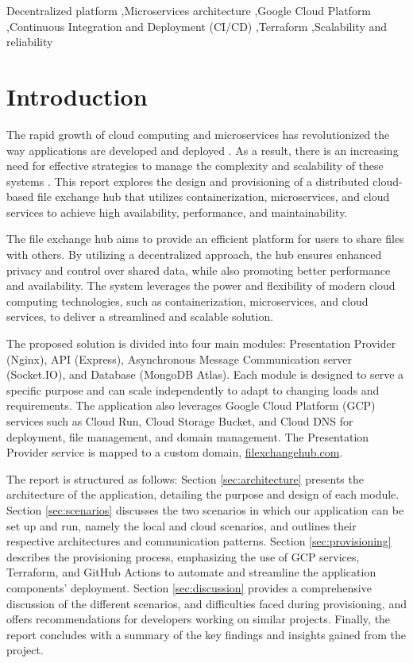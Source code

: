 \documentclass[a4paper,fleqn]{cas-sc}
\begin{document}
\begin{keywords}
Decentralized platform \sep Microservices architecture \sep Google Cloud Platform \sep Continuous Integration and Deployment (CI/CD) \sep Terraform \sep Scalability and reliability
\end{keywords}


\maketitle

\section{Introduction}

The rapid growth of cloud computing and microservices has revolutionized the way applications are developed and deployed \cite{}. As a result, there is an increasing need for effective strategies to manage the complexity and scalability of these systems \cite{}. This report explores the design and provisioning of a distributed cloud-based file exchange hub that utilizes containerization, microservices, and cloud services to achieve high availability, performance, and maintainability.

The file exchange hub aims to provide an efficient platform for users to share files with others. By utilizing a decentralized approach, the hub ensures enhanced privacy and control over shared data, while also promoting better performance and availability. The system leverages the power and flexibility of modern cloud computing technologies, such as containerization, microservices, and cloud services, to deliver a streamlined and scalable solution.

The proposed solution is divided into four main modules: Presentation Provider (Nginx), API (Express), Asynchronous Message Communication server (Socket.IO), and Database (MongoDB Atlas). Each module is designed to serve a specific purpose and can scale independently to adapt to changing loads and requirements. The application also leverages Google Cloud Platform (GCP) services such as Cloud Run, Cloud Storage Bucket, and Cloud DNS for deployment, file management, and domain management. The Presentation Provider service is mapped to a custom domain, \url{filexchangehub.com}.

The report is structured as follows: Section \ref{sec:architecture} presents the architecture of the application, detailing the purpose and design of each module. Section \ref{sec:scenarios} discusses the two scenarios in which our application can be set up and run, namely the local and cloud scenarios, and outlines their respective architectures and communication patterns. Section \ref{sec:provisioning} describes the provisioning process, emphasizing the use of GCP services, Terraform, and GitHub Actions to automate and streamline the application components' deployment. Section \ref{sec:discussion} provides a comprehensive discussion of the different scenarios, and difficulties faced during provisioning, and offers recommendations for developers working on similar projects. Finally, the report concludes with a summary of the key findings and insights gained from the project.
\end{document}
